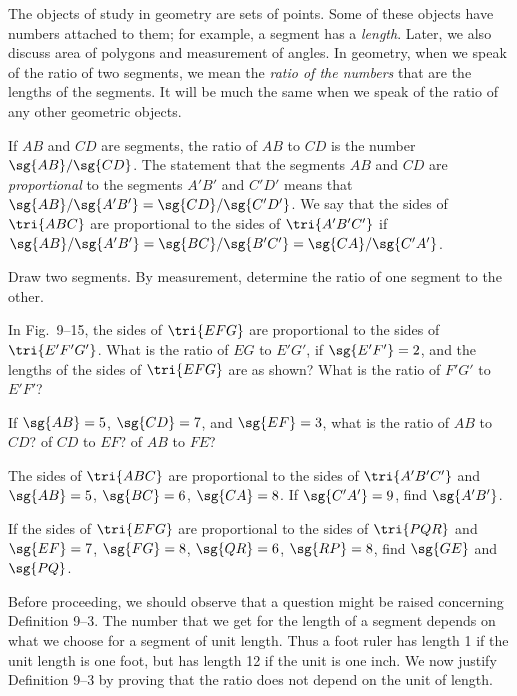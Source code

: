 \documentclass[11pt]{book}
\theoremstyle{bkplain}
\theoremstyle{XIplainnote}
\theoremstyle{bkplain}
\theoremstyle{bkplain}
\begin{document}
The objects of study in geometry are sets of points. Some of these objects have
numbers attached to them; for example, a segment has a \emph{length}. Later, we
also discuss area of polygons and measurement of angles. In geometry, when we
speak of the ratio of two segments, we mean the \emph{ratio of the numbers} that
are the lengths of the segments. It will be much the same when we speak of the
ratio of any other geometric objects.

\begin{definition}
If $AB$ and $CD$ are segments, the ratio of $AB$ to $CD$ is the number
$\sg{AB}/\sg{CD}$. The statement that the segments $AB$ and $CD$ are
\emph{proportional} to the segments $A'B'$ and $C'D'$ means that
$\sg{AB}/\sg{A'B'} = \sg{CD}/\sg{C'D'}$. We say that the sides of $\tri{ABC}$ are
proportional to the sides of $\tri{A'B'C'}$ if $\sg{AB}/\sg{A'B'} =
\sg{BC}/\sg{B'C'} = \sg{CA}/\sg{C'A'}$.
\end{definition}

\begin{exercisecols}
\begin{exlist}
\item Draw two segments. By measurement, determine the ratio of one segment to
      the other.
\item In Fig.~9--15, the sides of $\tri{EFG}$ are proportional to the sides of
      $\tri{E'F'G'}$. What is the ratio of $EG$ to $E'G'$, if $\sg{E'F'} = 2$,
      and the lengths of the sides of $\tri{EFG}$ are as shown? What is the ratio
      of $F'G'$ to $E'F'$?
\exfig{\FIGIXFIFTEEN}
\item If $\sg{AB} = 5$, $\sg{CD} = 7$, and $\sg{EF} = 3$, what is the ratio of
      $AB$ to $CD$? of $CD$ to $EF$? of $AB$ to $FE$?
\item The sides of $\tri{ABC}$ are proportional to the sides of $\tri{A'B'C'}$
      and $\sg{AB} = 5$, $\sg{BC} = 6$, $\sg{CA} = 8$. If $\sg{C'A'} = 9$, find
      $\sg{A'B'}$.
\item If the sides of $\tri{EFG}$ are proportional to the sides of $\tri{PQR}$
      and $\sg{EF} = 7$, $\sg{FG} = 8$, $\sg{QR} = 6$, $\sg{RP} = 8$, find
      $\sg{GE}$ and $\sg{PQ}$.
\end{exlist}
\end{exercisecols}

Before proceeding, we should observe that a question might be raised concerning
Definition 9--3. The number that we get for the length of a segment depends on
what we choose for a segment of unit length. Thus a foot ruler has length 1 if
the unit length is one foot, but has length 12 if the unit is one inch. We now
justify Definition 9--3 by proving that the ratio does not depend on the unit of
length.
\end{document}
